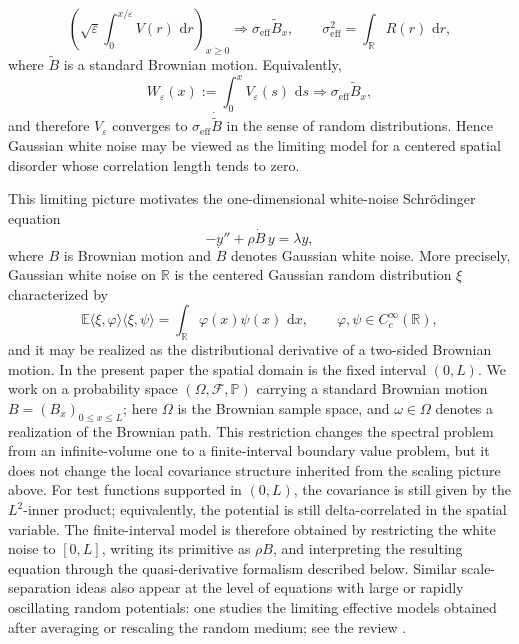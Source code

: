 \documentclass[11pt]{article}
\newcommand{\dd}{\,\mathrm d}
\newcommand{\E}{\mathbb E}
\newcommand{\Prob}{\mathbb P}
\newcommand{\R}{\mathbb R}
\begin{document}
\[
    \left(\sqrt{\varepsilon}\int_0^{x/\varepsilon}V(r)\,\dd r\right)_{x\ge0}
    \Longrightarrow
    \sigma_{\mathrm{eff}}\widetilde B_x,
    \qquad
    \sigma_{\mathrm{eff}}^2=\int_\R R(r)\,\dd r,
\]
where \(\widetilde B\) is a standard Brownian motion. Equivalently,
\[
    W_\varepsilon(x):=\int_0^x V_\varepsilon(s)\,\dd s
    \Longrightarrow \sigma_{\mathrm{eff}}\widetilde B_x,
\]
and therefore \(V_\varepsilon\) converges to \(\sigma_{\mathrm{eff}}\dot{\widetilde B}\) in the sense of random distributions. Hence Gaussian white noise may be viewed as the limiting model for a centered spatial disorder whose correlation length tends to zero.

This limiting picture motivates the one-dimensional white-noise Schr\"odinger equation
\[
    -y''+\rho \dot B\,y=\lambda y,
\]
where \(B\) is Brownian motion and \(\dot B\) denotes Gaussian white noise. More precisely, Gaussian white noise on \(\R\) is the centered Gaussian random distribution \(\xi\) characterized by
\[
    \E\langle \xi,\varphi\rangle\langle \xi,\psi\rangle
    =\int_\R \varphi(x)\psi(x)\,\dd x,
    \qquad \varphi,\psi\in C_c^\infty(\R),
\]
and it may be realized as the distributional derivative of a two-sided Brownian motion. In the present paper the spatial domain is the fixed interval \((0,L)\). We work on a probability space \((\Omega,\mathcal F,\Prob)\) carrying a standard Brownian motion \(B=(B_x)_{0\le x\le L}\); here \(\Omega\) is the Brownian sample space, and \(\omega\in\Omega\) denotes a realization of the Brownian path. This restriction changes the spectral problem from an infinite-volume one to a finite-interval boundary value problem, but it does not change the local covariance structure inherited from the scaling picture above. For test functions supported in \((0,L)\), the covariance is still given by the \(L^2\)-inner product; equivalently, the potential is still delta-correlated in the spatial variable. The finite-interval model is therefore obtained by restricting the white noise to \([0,L]\), writing its primitive as \(\rho B\), and interpreting the resulting equation through the quasi-derivative formalism described below. Similar scale-separation ideas also appear at the level of equations with large or rapidly oscillating random potentials: one studies the limiting effective models obtained after averaging or rescaling the random medium; see the review \cite{BalGuReview}.
\end{document}
